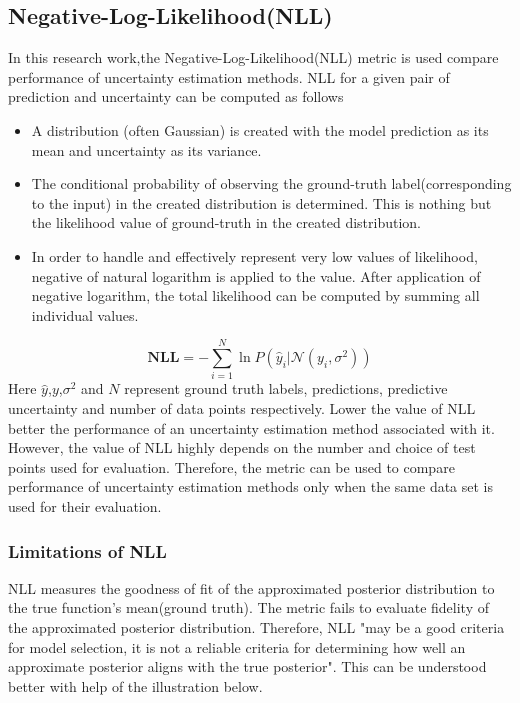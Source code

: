 \subsection{Negative-Log-Likelihood(NLL)}
In this research work,the Negative-Log-Likelihood(NLL) metric is used compare performance of uncertainty estimation methods. NLL for a given pair of prediction and uncertainty can be computed as follows
\begin{itemize}
	\item A distribution (often Gaussian) is created with the model prediction as its mean and uncertainty as its variance.
	\item The conditional probability of observing the ground-truth label(corresponding to the input) in the created distribution is determined. This is nothing but the likelihood value of ground-truth in the created distribution.
	\item  In order to handle and effectively represent very low values of likelihood, negative of natural logarithm is applied  to the value. After application of negative logarithm, the total likelihood can be computed by summing all individual values.
\end{itemize}
\begin{equation}
	\mathbf{NLL} = -\sum_{i=1}^{N}\ln P(\hat{y}_i|\mathcal{N}(y_i,\sigma^2)) 
\end{equation}
Here $\hat{y}$,$y$,$\sigma^2$ and $N$ represent ground truth labels, predictions, predictive uncertainty and number of data points respectively.
Lower the value of NLL better the performance of an uncertainty estimation method associated with it. However, the value of NLL highly depends on the number and choice of test points used for evaluation. Therefore, the metric can be used to compare performance of uncertainty estimation methods only when the same data set is used for their evaluation.
\subsubsection{Limitations of NLL}
NLL measures the goodness of fit of the approximated posterior distribution to the true function's mean(ground truth). The metric fails to evaluate fidelity of the approximated posterior distribution. Therefore, NLL "may be a good criteria for model
selection, it is not a reliable criteria for determining how well an approximate posterior aligns with the true posterior"\cite{yao2019quality}. This can be understood better with help of the illustration below.  

